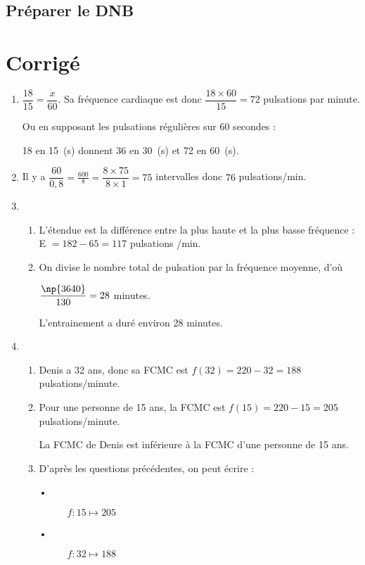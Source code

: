 \documentclass[openany]{book}
\begin{document}
\begin{seance}

\section{Préparer le DNB}


\end{seance}

\vspace{0.4cm}
\section{Corrigé}

\vspace{0.4cm}




\begin{enumerate}
\item $\dfrac{18}{15} = \dfrac{x}{60}$. Sa fréquence cardiaque est donc  $\dfrac{18 \times 60}{15} = 72$ pulsations par minute.

Ou en supposant les pulsations régulières sur 60 secondes :

18 en 15~(s) donnent 36 en 30~(s) et 72 en 60~(s).
\item Il y a $\dfrac{60}{0,8} = \frac{600}{8} = \dfrac{8 \times 75}{8 \times 1} =  75$ intervalles donc $76$ pulsations/min.
\item 
	\begin{enumerate}
		\item L'étendue est la différence entre la plus haute et la plus basse fréquence : E $= 182 - 65 = 117$ pulsations /min.
		\item On divise le nombre total de pulsation par la fréquence moyenne, d'où
		
$\dfrac{\np{3640}}{130} = 28$ minutes.
		
L'entrainement a duré environ 28 minutes.
	\end{enumerate}		
\item
	\begin{enumerate} 
		\item Denis a 32 ans, donc sa FCMC est $f(32) = 220 - 32 = 188$ pulsations/minute.
		\item Pour une personne de 15 ans, la FCMC est $f(15) = 220 - 15 = 205$ pulsations/minute.

La FCMC de Denis est inférieure à la FCMC d'une personne de 15 ans.
		\item D'après les questions précédentes, on peut écrire :
			\begin{description}
			\item[•] $f: 15 \mapsto 205$
			\item[•] $f: 32 \mapsto 188$
			\end{description}
		

\end{enumerate}
\end{enumerate}
\end{document}
